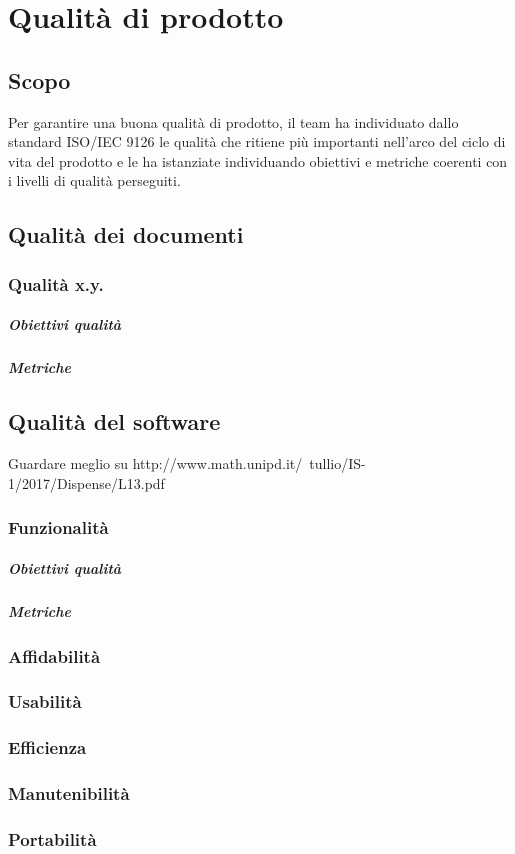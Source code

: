\documentclass[PianoDiProgetto.tex]{subfiles}
\begin{document}
\chapter{Qualità di prodotto}

\section{Scopo}
Per garantire una buona qualità di prodotto, il team ha individuato dallo standard ISO/IEC 9126 le qualità che ritiene più importanti nell’arco del ciclo di vita del prodotto e le ha istanziate individuando obiettivi e metriche coerenti con i livelli di qualità perseguiti.


\section{Qualità dei documenti}
	\subsection{Qualità x.y.}
		\paragraph{Obiettivi qualità}
		\paragraph{Metriche}

		
\section{Qualità del software}
	Guardare meglio su 
http://www.math.unipd.it/~tullio/IS-1/2017/Dispense/L13.pdf

	\subsection{Funzionalità}
		\paragraph{Obiettivi qualità}
		\paragraph{Metriche}
		
	\subsection{Affidabilità}
	
	
	\subsection{Usabilità}
	
	
	\subsection{Efficienza}
	
	
	\subsection{Manutenibilità}
	
	
	\subsection{Portabilità}
\end{document}
